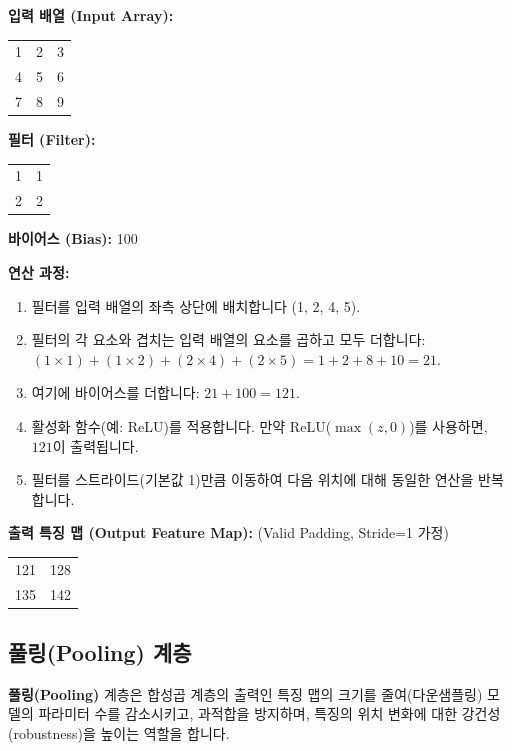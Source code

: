 \documentclass[11pt,a4paper]{article}
\theoremstyle{definition}
\begin{document}
\begin{tcolorbox}[examplebox, title=\textbf{예시}]
\textbf{입력 배열 (Input Array):}
\begin{tabular}{ccc}
\toprule
1 & 2 & 3 \\
4 & 5 & 6 \\
7 & 8 & 9 \\
\bottomrule
\end{tabular}

\textbf{필터 (Filter):}
\begin{tabular}{cc}
\toprule
1 & 1 \\
2 & 2 \\
\bottomrule
\end{tabular}
\textbf{바이어스 (Bias):} 100

\textbf{연산 과정:}
\begin{enumerate}
    \item 필터를 입력 배열의 좌측 상단에 배치합니다 (1, 2, 4, 5).
    \item 필터의 각 요소와 겹치는 입력 배열의 요소를 곱하고 모두 더합니다: $(1 \times 1) + (1 \times 2) + (2 \times 4) + (2 \times 5) = 1 + 2 + 8 + 10 = 21$.
    \item 여기에 바이어스를 더합니다: $21 + 100 = 121$.
    \item 활성화 함수(예: ReLU)를 적용합니다. 만약 ReLU($\max(z, 0)$)를 사용하면, $121$이 출력됩니다.
    \item 필터를 스트라이드(기본값 1)만큼 이동하여 다음 위치에 대해 동일한 연산을 반복합니다.
\end{enumerate}
\textbf{출력 특징 맵 (Output Feature Map):} (Valid Padding, Stride=1 가정)
\begin{tabular}{cc}
\toprule
121 & 128 \\
135 & 142 \\
\bottomrule
\end{tabular}
\end{tcolorbox}

\subsection{풀링(Pooling) 계층}

\begin{tcolorbox}[conceptbox, title=\textbf{핵심 개념}]
\textbf{풀링(Pooling)} 계층은 합성곱 계층의 출력인 특징 맵의 크기를 줄여(다운샘플링) 모델의 파라미터 수를 감소시키고, 과적합을 방지하며, 특징의 위치 변화에 대한 강건성(robustness)을 높이는 역할을 합니다.
\end{tcolorbox}
\end{document}
